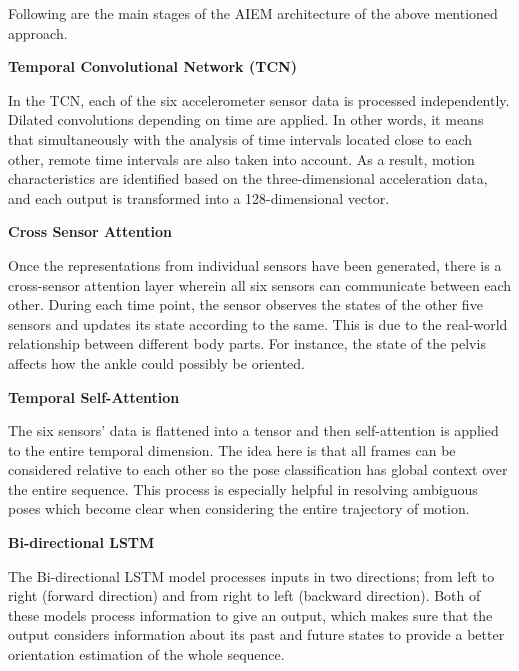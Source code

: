 \documentclass[12pt, a4paper, oneside]{report}
\begin{document}
\begin{enumerate}
\begin{enumerate}[label=\roman*.]
Following are the main stages of the AIEM architecture of the above mentioned approach.

\textbf{Temporal Convolutional Network (TCN)}

In the TCN, each of the six accelerometer sensor data is processed independently. Dilated convolutions depending on time are applied. In other words, it means that simultaneously with the analysis of time intervals located close to each other, remote time intervals are also taken into account. As a result, motion characteristics are identified based on the three-dimensional acceleration data, and each output is transformed into a 128-dimensional vector.

\newpage

\textbf{Cross Sensor Attention}

Once the representations from individual sensors have been generated, there is a cross-sensor attention layer wherein all six sensors can communicate between each other. During each time point, the sensor observes the states of the other five sensors and updates its state according to the same. This is due to the real-world relationship between different body parts. For instance, the state of the pelvis affects how the ankle could possibly be oriented.

\vspace{0.3cm}

\textbf{Temporal Self-Attention}

The six sensors' data is flattened into a tensor and then self-attention is applied to the entire temporal dimension. The idea here is that all frames can be considered relative to each other so the pose classification has global context over the entire sequence. This process is especially helpful in resolving ambiguous poses which become clear when considering the entire trajectory of motion.

\vspace{0.3cm}

\textbf{Bi-directional LSTM}

The Bi-directional LSTM model processes inputs in two directions; from left to right (forward direction) and from right to left (backward direction). Both of these models process information to give an output, which makes sure that the output considers information about its past and future states to provide a better orientation estimation of the whole sequence.

\vspace{0.3cm}


\end{enumerate}
\end{enumerate}
\end{document}
